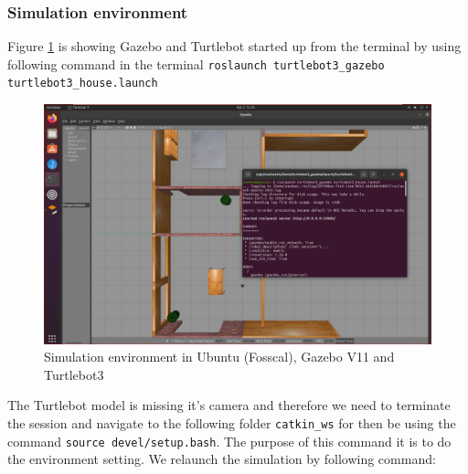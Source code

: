 \documentclass[12pt,a4paper]{article}
\begin{document}
	\subsubsection{Simulation environment}
	Figure \ref{fig:fig1} is showing Gazebo and Turtlebot started up from the terminal by using following command in the terminal \texttt{roslaunch turtlebot3\_gazebo turtlebot3\_house.launch}
	\begin{figure}[!h]
		\centering
		\includegraphics[width=\linewidth]{fig1.png}
		\caption{Simulation environment in Ubuntu (Fosscal), Gazebo V11 and Turtlebot3}
		\label{fig:fig1}
	\end{figure}
	
	\noindent The Turtlebot model is missing it's camera and therefore we need to terminate the session and navigate to the following folder \texttt{catkin\_ws} for then be using the command \texttt{source devel/setup.bash}. The purpose of this command it is to do the environment setting. We relaunch the simulation by following command:
	
\end{document}
